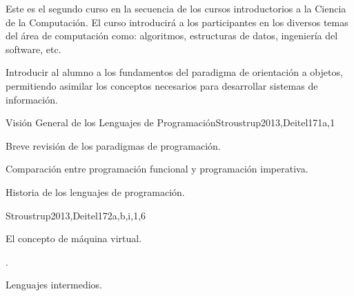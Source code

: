 \begin{syllabus}


\begin{justification}
Este es el segundo curso en la secuencia de los cursos introductorios a la Ciencia de la Computación.
El curso introducirá a los participantes en los diversos temas del área de computación como: algoritmos, estructuras de datos, ingeniería del software, etc.
\end{justification}

\begin{goals}
\item Introducir al alumno a los fundamentos del paradigma de orientación a objetos, permitiendo asimilar los conceptos necesarios para desarrollar sistemas de información.
\end{goals}



\begin{unit}{Visión General de los Lenguajes de Programación}{}{Stroustrup2013,Deitel17}{1}{a,1}
    \begin{topics}
        \item Breve revisión de los paradigmas de programación.
        \item Comparación entre programación funcional y programación imperativa.
        \item Historia de los lenguajes de programación.
    \end{topics}
    \begin{learningoutcomes}
        \item \SPHistoryLODiscussTheForLanguage [\Familiarity]
    \end{learningoutcomes}
\end{unit}

\begin{unit}{\OSVirtualMachines}{}{Stroustrup2013,Deitel17}{2}{a,b,i,1,6}
    \begin{topics}
        \item El concepto de máquina virtual.
        \item \OSVirtualMachinesTopicTypes.
        \item Lenguajes intermedios.
    \end{topics}
    \begin{learningoutcomes}
        \item \OSVirtualMachinesLOExplainTheVirtual [\Familiarity]
        \item \OSVirtualMachinesLODifferentiateEmulation [\Familiarity]
        \item \OSVirtualMachinesLOEvaluateVirtualization [\Assessment]
    \end{learningoutcomes}
\end{unit}


\end{syllabus}
